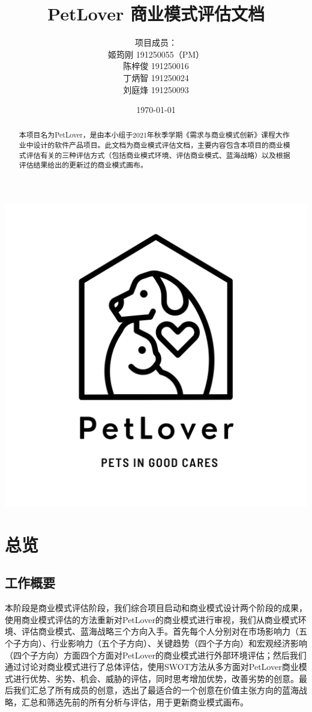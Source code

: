 \documentclass[a4paper]{ctexart}
\title{\Huge PetLover 商业模式评估文档}
\author{
  项目成员：\\
  姬筠刚 191250055（PM）\\
  陈梓俊 191250016\\
  丁炳智 191250024\\
  刘庭烽 191250093\\
}
\date{\today}
\begin{document}
\maketitle

\centerline{\includegraphics[]{logo.png}}

\newpage

\begin{abstract}
  本项目名为PetLover，是由本小组于2021年秋季学期《需求与商业模式创新》课程大作业中设计的软件产品项目。此文档为商业模式评估文档，主要内容包含本项目的商业模式评估有关的三种评估方式（包括商业模式环境、评估商业模式、蓝海战略）以及根据评估结果给出的更新过的商业模式画布。
\end{abstract}

\tableofcontents

\newpage

\setlength{\parskip}{1em}

\section{总览}
\subsection{工作概要}
本阶段是商业模式评估阶段，我们综合项目启动和商业模式设计两个阶段的成果，使用商业模式评估的方法重新对PetLover的商业模式进行审视，我们从商业模式环境、评估商业模式、蓝海战略三个方向入手。首先每个人分别对在市场影响力（五个子方向）、行业影响力（五个子方向）、关键趋势（四个子方向）和宏观经济影响（四个子方向）方面四个方面对PetLover的商业模式进行外部环境评估；然后我们通过讨论对商业模式进行了总体评估，使用SWOT方法从多方面对PetLover商业模式进行优势、劣势、机会、威胁的评估，同时思考增加优势，改善劣势的创意。最后我们汇总了所有成员的创意，选出了最适合的一个创意在价值主张方向的蓝海战略，汇总和筛选先前的所有分析与评估，用于更新商业模式画布。
\end{document}
